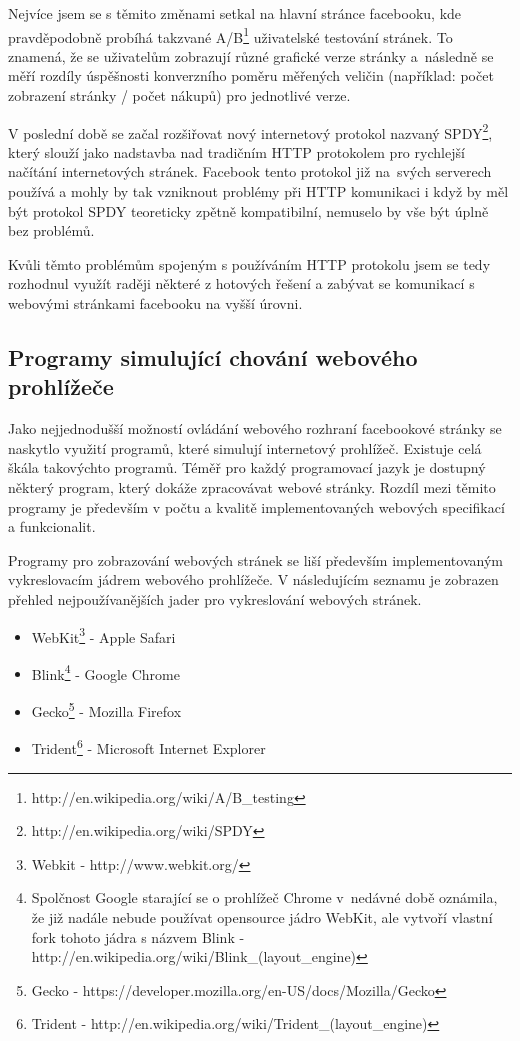 \documentclass[thesis=M,czech]{FITthesis}[2013/05/10]
\begin{document}
Nejvíce jsem se s těmito změnami setkal na hlavní stránce facebooku, kde pravděpodobně probíhá takzvané A/B\footnote{http://en.wikipedia.org/wiki/A/B\_testing} uživatelské testování stránek. To znamená, že se uživatelům zobrazují různé grafické verze stránky a~následně se měří rozdíly úspěšnosti konverzního poměru měřených veličin (například: počet zobrazení stránky / počet nákupů) pro jednotlivé verze.

V poslední době se začal rozšiřovat nový internetový protokol nazvaný SPDY\footnote{http://en.wikipedia.org/wiki/SPDY}, který slouží jako nadstavba nad tradičním HTTP protokolem pro rychlejší načítání internetových stránek. Facebook tento protokol již na~svých serverech používá a mohly by tak vzniknout problémy při HTTP komunikaci i když by měl být protokol SPDY teoreticky zpětně kompatibilní, nemuselo by vše být úplně bez problémů.

Kvůli těmto problémům spojeným s používáním HTTP protokolu jsem se tedy rozhodnul využít raději některé z hotových řešení a zabývat se komunikací s webovými stránkami facebooku na vyšší úrovni. 

\subsection{Programy simulující chování webového prohlížeče}

Jako nejjednodušší možností ovládání webového rozhraní facebookové stránky se naskytlo využití programů, které simulují internetový prohlížeč. Existuje celá škála takovýchto programů. Téměř pro každý programovací jazyk je dostupný některý program, který dokáže zpracovávat webové stránky. Rozdíl mezi těmito programy je především v počtu a kvalitě implementovaných webových specifikací a funkcionalit.

Programy pro zobrazování webových stránek se liší především implementovaným vykreslovacím jádrem webového prohlížeče. V následujícím seznamu je zobrazen přehled nejpoužívanějších jader pro vykreslování webových stránek.

\begin{itemize}
  \item WebKit\footnote{Webkit - http://www.webkit.org/} - Apple Safari
  \item Blink\footnote{Spolčnost Google starající se o prohlížeč Chrome v~nedávné době oznámila, že již nadále nebude používat opensource jádro WebKit, ale vytvoří vlastní fork tohoto jádra s názvem Blink -  http://en.wikipedia.org/wiki/Blink\_(layout\_engine)} - Google Chrome
  \item Gecko\footnote{Gecko - https://developer.mozilla.org/en-US/docs/Mozilla/Gecko} - Mozilla Firefox
  \item Trident\footnote{Trident - http://en.wikipedia.org/wiki/Trident\_(layout\_engine)} - Microsoft Internet Explorer
\end{itemize}
 
\end{document}
